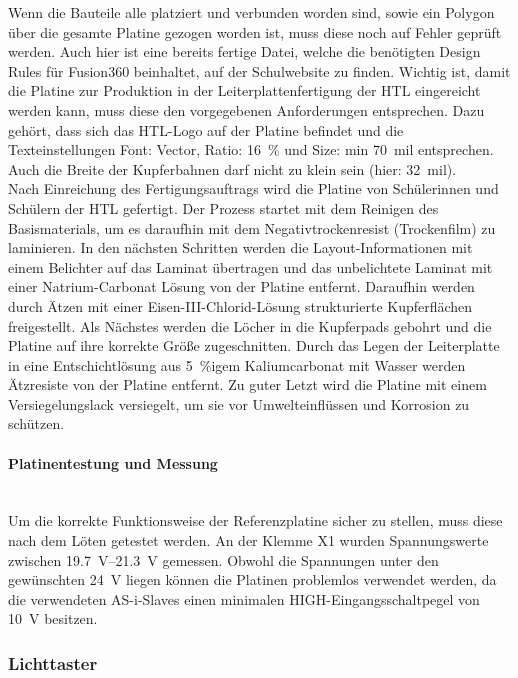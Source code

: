 Wenn die Bauteile alle platziert und verbunden worden sind, sowie ein Polygon über die gesamte Platine gezogen worden ist, muss diese noch auf Fehler geprüft werden. Auch hier ist eine bereits fertige Datei, welche die benötigten Design Rules für Fusion360 beinhaltet, auf der Schulwebsite zu finden. Wichtig ist, damit die Platine zur Produktion in der Leiterplattenfertigung der HTL eingereicht werden kann, muss diese den vorgegebenen Anforderungen entsprechen. Dazu gehört, dass sich das HTL-Logo auf der Platine befindet und die Texteinstellungen Font: Vector, Ratio: \qty{16}{\percent} und Size: min \qty{70}{mil} entsprechen. Auch die Breite der Kupferbahnen darf nicht zu klein sein (hier: \qty{32}{mil}).\\
Nach Einreichung des Fertigungsauftrags wird die Platine von Schülerinnen und Schülern der HTL gefertigt. Der Prozess startet mit dem Reinigen des Basismaterials, um es daraufhin mit dem Negativtrockenresist (Trockenfilm) zu laminieren. In den nächsten Schritten werden die Layout-Informationen mit einem Belichter auf das Laminat übertragen und das unbelichtete Laminat mit einer Natrium-Carbonat Lösung von der Platine entfernt. Daraufhin werden durch Ätzen mit einer Eisen-III-Chlorid-Lösung strukturierte Kupferflächen freigestellt. Als Nächstes werden die Löcher in die Kupferpads gebohrt und die Platine auf ihre korrekte Größe zugeschnitten. Durch das Legen der Leiterplatte in eine Entschichtlösung aus \qty{5}{\percent}{igem} Kaliumcarbonat mit Wasser werden Ätzresiste von der Platine entfernt. Zu guter Letzt wird die Platine mit einem Versiegelungslack versiegelt, um sie vor Umwelteinflüssen und Korrosion zu schützen.

\paragraph{Platinentestung und Messung} \mbox{}\\
Um die korrekte Funktionsweise der Referenzplatine sicher zu stellen, muss diese nach dem Löten getestet werden. An der Klemme X1 wurden Spannungswerte zwischen \qtyrange{19.7}{21.3}{\volt} gemessen. Obwohl die Spannungen unter den gewünschten \qty{24}{\volt} liegen können die Platinen problemlos verwendet werden, da die verwendeten AS-i-Slaves einen minimalen HIGH-Eingangsschaltpegel von \qty{10}{\volt} besitzen.\cite{AS-i-Slave}

\subsubsection{Lichttaster}

